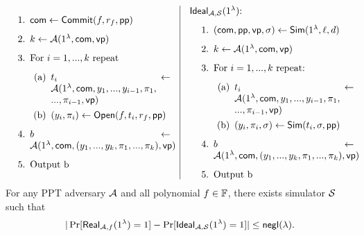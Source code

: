 \begin{itemize}
\begin{align*}
\begin{minipage}{.5\linewidth}
\begin{enumerate}
							\item $\comm \leftarrow \Commit(f, r_f, \pp)$
							\item $k\leftarrow \mathcal{A}(1^\lambda, \comm, \vp)$
							\item \text{For $i=1,...,k$ repeat}
							\begin{enumerate}
								\item $t_i \leftarrow \A(1^\lambda, \comm, y_1, ..., y_{i-1}, \pi_1,\\ ..., \pi_{i-1}, \vp)$
								\item $(y_i, \pi_i) \leftarrow \Open(f, t_i, r_f, \pp)$
							\end{enumerate}
							\item $b \leftarrow \A(1^\lambda, \comm, (y_1, ..., y_k, \pi_1, ..., \pi_k), \vp)$
							\item \text{Output b}
						\end{enumerate}
					\end{minipage}
					\hspace*{10pt}\vline \hspace*{10pt}
					\begin{minipage}{.5\linewidth}
						$\mathsf{Ideal}_{\A, \S}(1^\lambda)$:
						\begin{enumerate}
							\item $(\comm, \pp, \vp, \sigma) \leftarrow \mathsf{Sim}(1^\lambda, \ell, d)$
							\item $k \leftarrow \A(1^\lambda, \comm, \vp)$
							\item \text{For $i=1,...,k$ repeat}:
							\begin{enumerate}
								\item $t_i \leftarrow \A(1^\lambda, \comm, y_1, ..., y_{i-1}, \pi_1,\\ ..., \pi_{i-1}, \vp)$
								\item $(y_i, \pi_i, \sigma) \leftarrow \mathsf{Sim}(t_i, \sigma, \pp)$
							\end{enumerate}
							\item $b \leftarrow \A(1^\lambda, \comm, (y_1, ..., y_k, \pi_1, ..., \pi_k), \vp)$
							\item \text{Output b}
						\end{enumerate}
					\end{minipage}
				\end{align*}
				For any PPT adversary $\A$ and all polynomial $f\in\F$, there exists simulator $\S$ such that
				\[
				|\Pr[\mathsf{Real}_{\A, f}(1^\lambda)=1] - \Pr[\mathsf{Ideal}_{\A, \S}(1^\lambda)=1]|\le \negl(\lambda).
				\]
\end{itemize}



